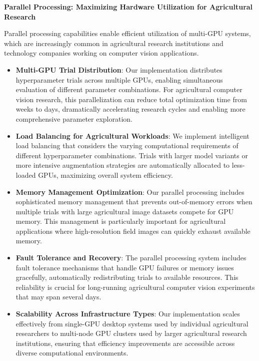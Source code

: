 \textbf{Parallel Processing: Maximizing Hardware Utilization for Agricultural Research}

Parallel processing capabilities enable efficient utilization of multi-GPU systems, which are increasingly common in agricultural research institutions and technology companies working on computer vision applications.

\begin{itemize}
    \item \textbf{Multi-GPU Trial Distribution}: Our implementation distributes hyperparameter trials across multiple GPUs, enabling simultaneous evaluation of different parameter combinations. For agricultural computer vision research, this parallelization can reduce total optimization time from weeks to days, dramatically accelerating research cycles and enabling more comprehensive parameter exploration.
    
    \item \textbf{Load Balancing for Agricultural Workloads}: We implement intelligent load balancing that considers the varying computational requirements of different hyperparameter combinations. Trials with larger model variants or more intensive augmentation strategies are automatically allocated to less-loaded GPUs, maximizing overall system efficiency.
    
    \item \textbf{Memory Management Optimization}: Our parallel processing includes sophisticated memory management that prevents out-of-memory errors when multiple trials with large agricultural image datasets compete for GPU memory. This management is particularly important for agricultural applications where high-resolution field images can quickly exhaust available memory.
    
    \item \textbf{Fault Tolerance and Recovery}: The parallel processing system includes fault tolerance mechanisms that handle GPU failures or memory issues gracefully, automatically redistributing trials to available resources. This reliability is crucial for long-running agricultural computer vision experiments that may span several days.
    
    \item \textbf{Scalability Across Infrastructure Types}: Our implementation scales effectively from single-GPU desktop systems used by individual agricultural researchers to multi-node GPU clusters used by larger agricultural research institutions, ensuring that efficiency improvements are accessible across diverse computational environments.
\end{itemize}

